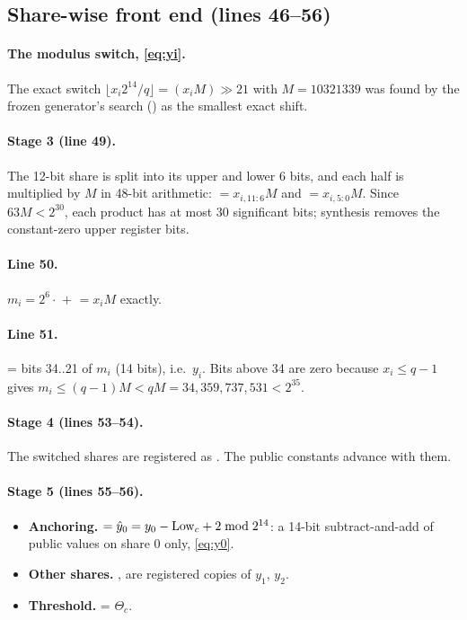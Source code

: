 \subsection{Share-wise front end (lines 46--56)}\label{app:v-front}

\paragraph{The modulus switch, \cref{eq:yi}.} The exact switch $\lfloor x_i 2^{14}/q \rfloor = (x_i M) \gg 21$ with $M = 10321339$ was found by the frozen generator's search () as the smallest exact shift.

\paragraph{Stage 3 (line 49).} The 12-bit share is split into its upper and lower 6 bits, and each half is multiplied by $M$ in 48-bit arithmetic:  $= x_{i,11:6} M$ and  $= x_{i,5:0} M$. Since $63 M < 2^{30}$, each product has at most 30 significant bits; synthesis removes the constant-zero upper register bits.

\paragraph{Line 50.} $m_i = 2^6 \cdot$ $+$  $= x_i M$ exactly.

\paragraph{Line 51.}  = bits 34..21 of $m_i$ (14 bits), i.e.\ $y_i$. Bits above 34 are zero because $x_i \le q - 1$ gives $m_i \le (q-1)M < qM = 34{,}359{,}737{,}531 < 2^{35}$.

\paragraph{Stage 4 (lines 53--54).} The switched shares are registered as . The public constants advance with them.

\paragraph{Stage 5 (lines 55--56).}
\begin{itemize}
  \item \textbf{Anchoring.}  $= \hat y_0 = y_0 - \mathrm{Low}_c + 2 \bmod 2^{14}$: a 14-bit subtract-and-add of public values on share 0 only, \cref{eq:y0}.
  \item \textbf{Other shares.} ,  are registered copies of $y_1$, $y_2$.
  \item \textbf{Threshold.}  = $\Theta_c$.
\end{itemize}


